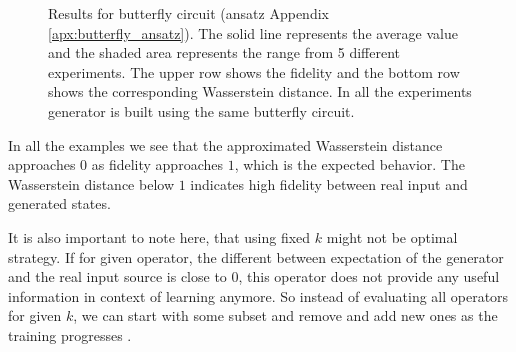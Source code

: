 \begin{figure}[htbp!]
  \caption{Results for butterfly circuit (ansatz Appendix \ref{apx:butterfly_ansatz}).
    The solid line represents the average value and the shaded area
    represents the range from 5 different experiments. The upper row shows the
    fidelity and the bottom row shows the corresponding Wasserstein distance. In all the
    experiments generator is built using the same butterfly circuit.}
  \label{fig:wqgans_res_butterfly_same}
\end{figure}


In all the examples we see that the approximated Wasserstein distance approaches $0$
as fidelity approaches $1$, which is the expected behavior. The Wasserstein
distance below $1$ indicates high fidelity between real input and generated
states.

It is also important to note here, that using fixed $k$ might not be optimal
strategy. If for given operator, the different between expectation of the
generator and the real input source is close to $0$, this operator does not
provide any useful information in context of learning anymore. So instead of
evaluating all operators for given $k$, we can start with some subset and
remove and add new ones as the training progresses \cite{kiani2021quantum}. 
